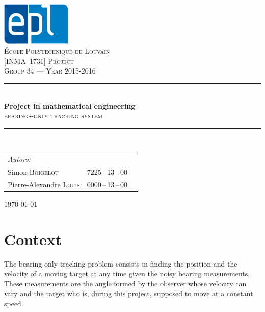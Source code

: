 \documentclass[a4paper,12pt]{report}
\newcommand{\HRule}{\rule{\linewidth}{0.5mm}}
\begin{document}
\fancyhead[R]{\thepage}
\makeatletter
\let\@oddfoot\@empty
\let\@evenfoot\@empty
\makeatother
\begin{titlepage}
\begin{center}

\includegraphics[width=0.25\textwidth]{epl-logo}~\\[0.3cm]

\textsc{\LARGE École Polytechnique de Louvain}\\[0.8cm]
\textsc{\Large [INMA~1731] Project}\\[0.8cm]

\textsc{\Large Group 34 --- Year 2015-2016}\\[0.5cm]

\HRule \\[0.2cm]
{ \huge \bfseries Project in mathematical engineering\\[0.6cm] }
\textsc{\LARGE  bearings-only tracking system}\\[0.2cm]


\HRule \\[0.5cm]

{\large
\begin{tabu} to 0.8\linewidth {Xll}
    \emph{Autors:}\\
    \quad Simon \textsc{Boigelot} & 7225\,--\,13\,--\,00\\
    \quad Pierre-Alexandre \textsc{Louis} & 0000\,--\,13\,--\,00\\
\end{tabu}
}

\vfill

{\large \today}

\end{center}
\end{titlepage}


\setlength{\parskip}{0.35cm}


\chapter*{Context}

The bearing only tracking problem consists in finding the position and the velocity of a moving target at any time given the noisy bearing measurements. These measurements are the angle formed by the observer whose velocity can vary and the target who is, during this project, supposed to move at a constant speed.
\end{document}
